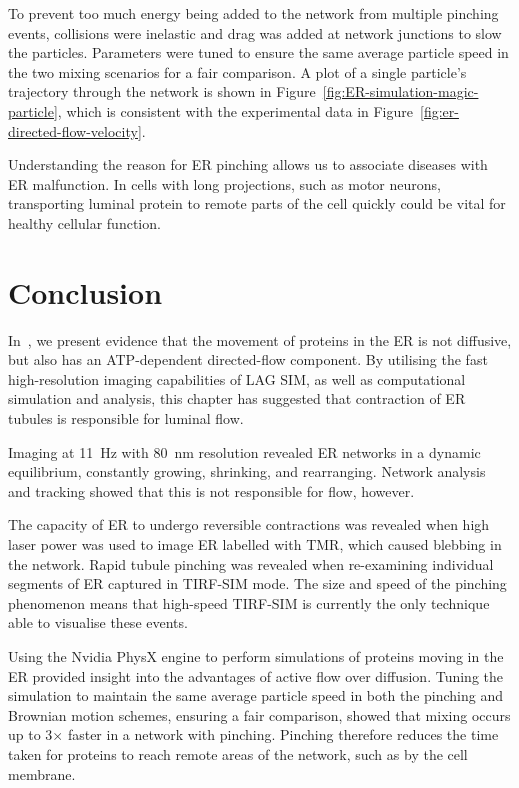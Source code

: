 To prevent too much energy being added to the network from multiple pinching events, collisions were inelastic and drag was added at network junctions to slow the particles. 
Parameters were tuned to ensure the same average particle speed in the two mixing scenarios for a fair comparison. 
A plot of a single particle's trajectory through the network is shown in Figure~\ref{fig:ER-simulation-magic-particle}, which is consistent with the experimental data in Figure~\ref{fig:er-directed-flow-velocity}. 

Understanding the reason for ER pinching allows us to associate diseases with ER malfunction. 
In cells with long projections, such as motor neurons, transporting luminal protein to remote parts of the cell quickly could be vital for healthy cellular function. 

\section{Conclusion} 
In~\cite{holcman2018single}, we present evidence that the movement of proteins in the ER is not diffusive, but also has an ATP-dependent directed-flow component.
By utilising the fast high-resolution imaging capabilities of LAG SIM, as well as computational simulation and analysis, this chapter has suggested that contraction of ER tubules is responsible for luminal flow. 

Imaging at \SI{11}{\hertz} with \SI{80}{\nano\metre} resolution revealed ER networks in a dynamic equilibrium, constantly growing, shrinking, and rearranging. 
Network analysis and tracking showed that this is not responsible for flow, however.

The capacity of ER to undergo reversible contractions was revealed when high laser power was used to image ER labelled with TMR, which caused blebbing in the network.
Rapid tubule pinching was revealed when re-examining individual segments of ER captured in TIRF-SIM mode. 
The size and speed of the pinching phenomenon means that high-speed TIRF-SIM is currently the only technique able to visualise these events. 

Using the Nvidia PhysX engine to perform simulations of proteins moving in the ER provided insight into the advantages of active flow over diffusion.
Tuning the simulation to maintain the same average particle speed in both the pinching and Brownian motion schemes, ensuring a fair comparison, showed that mixing occurs up to 3$\times$ faster in a network with pinching.
Pinching therefore reduces the time taken for proteins to reach remote areas of the network, such as by the cell membrane. 

